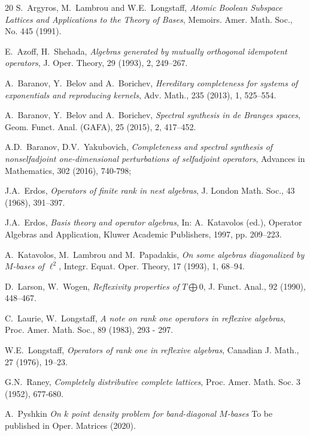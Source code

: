 \begin {thebibliography}{20}
    S.~\!Argyros, M.~\!Lambrou and W.E.~\!Longstaff,
    \emph{Atomic Boolean Subspace Lattices and Applications to the Theory of Bases},
    Memoirs. Amer. Math. Soc., No. 445 (1991).

    E.~\!Azoff, H.~\!Shehada,
    \emph{Algebras generated by mutually orthogonal idempotent operators},
    J. Oper. Theory, 29 (1993), 2, 249--267.

    A.~\!Baranov, Y.~\!Belov and A.~\!Borichev,
    \emph{Hereditary completeness for systems of exponentials and reproducing kernels},
    Adv. Math., 235 (2013), 1, 525--554.

    A.~\!Baranov, Y.~\!Belov and A.~\!Borichev,
    \emph{Spectral synthesis in de Branges spaces},
    Geom. Funct. Anal. (GAFA), 25 (2015), 2, 417--452.

    A.D.~\!Baranov, D.V.~\!Yakubovich,
    \emph{Completeness and spectral synthesis of nonselfadjoint one-dimensional
    perturbations of selfadjoint operators},
    Advances in Mathematics, 302 (2016), 740-798;

    J.A.~\!Erdos,
    \emph{Operators of finite rank in nest algebras},
    J. London Math. Soc., 43 (1968), 391--397.

    J.A.~\!Erdos,
    \emph{Basis theory and operator algebras},
    In: A.~\!Katavolos (ed.), Operator Algebras and Application, Kluwer Academic Publishers, 1997, pp. 209--223.

    A.~\!Katavolos, M.~\!Lambrou and M.~\!Papadakis,
    \emph{On some algebras diagonalized by $M$-bases of $\ell^2$},
    Integr. Equat. Oper. Theory, 17 (1993), 1, 68--94.

    D.~\!Larson, W.~\!Wogen,
    \emph{Reflexivity properties of $T\bigoplus0$},
    J. Funct. Anal., 92 (1990), 448--467.

    C.~\!Laurie, W.~\!Longstaff,
    \emph{A note on rank one operators in reflexive algebras},
    Proc. Amer. Math. Soc., 89 (1983), 293 - 297.

    W.E.~\!Longstaff,
    \emph{Operators of rank one in reflexive algebras},
    Canadian J. Math., 27 (1976), 19--23.

    G.N.~\!Raney,
    \emph{Completely distributive complete lattices},
    Proc. Amer. Math. Soc. 3 (1952), 677-680.

    A.~\!Pyshkin
    \emph{On $k$ point density problem for band-diagonal $M$-bases}
    To be published in Oper. Matrices (2020).


\end{thebibliography}
